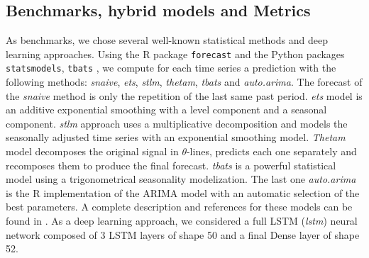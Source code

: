 \documentclass{article} %
\begin{document}




\subsection{Benchmarks, hybrid models and Metrics}

As benchmarks, we chose several well-known statistical methods and deep learning approaches. Using the R package \texttt{forecast} and the Python packages \texttt{statsmodels},  \texttt{tbats} , we compute for each time series a prediction with the following methods: \textit{snaive}, \textit{ets}, \textit{stlm}, \textit{thetam}, \textit{tbats} and \textit{auto.arima}. The forecast of the \textit{snaive} method is only the repetition of the last same past period. \textit{ets} model is an additive exponential smoothing with a level component and a seasonal component. \textit{stlm} approach uses a multiplicative decomposition and models the seasonally adjusted time series with an exponential smoothing model. \textit{Thetam} model decomposes the original signal in $\theta$-lines, predicts each one separately and recomposes them to produce the final forecast. \textit{tbats} is a powerful statistical model using a trigonometrical seasonality modelization. The last one \textit{auto.arima} is the R implementation of the ARIMA model with an automatic selection of the best parameters. A complete description and references for these models can be found in \citep{hyndman2020package}. As a deep learning approach, we considered a full LSTM (\textit{lstm}) neural network composed of 3 LSTM layers of shape 50 and a final Dense layer of shape 52.
\end{document}

